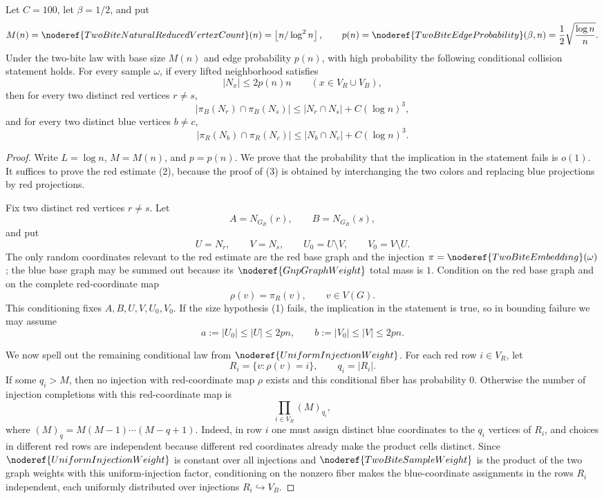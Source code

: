 \begin{lemma}
Let \(C=100\), let \(\beta=1/2\), and put
\[
M(n)=\noderef{TwoBiteNaturalReducedVertexCount}(n)
=\left\lfloor n/\log^2 n\right\rfloor,\qquad
p(n)=\noderef{TwoBiteEdgeProbability}(\beta,n)
=\frac12\sqrt{\frac{\log n}{n}} .
\]
Under the two-bite law with base size \(M(n)\) and edge probability \(p(n)\),
with high probability the following conditional collision statement holds.
For every sample \(\omega\), if every lifted neighborhood satisfies
\[
|N_x|\le 2p(n)n\qquad (x\in V_R\cup V_B),
\tag{1}
\]
then for every two distinct red vertices \(r\ne s\),
\[
|\pi_B(N_r)\cap\pi_B(N_s)|
\le |N_r\cap N_s|+C(\log n)^3,
\tag{2}
\]
and for every two distinct blue vertices \(b\ne c\),
\[
|\pi_R(N_b)\cap\pi_R(N_c)|
\le |N_b\cap N_c|+C(\log n)^3.
\tag{3}
\]
\end{lemma}
\begin{proof}
Write \(L=\log n\), \(M=M(n)\), and \(p=p(n)\).  We prove that the
probability that the implication in the statement fails is \(o(1)\).  It
suffices to prove the red estimate (2), because the proof of (3) is obtained
by interchanging the two colors and replacing blue projections by red
projections.

Fix two distinct red vertices \(r\ne s\).  Let
\[
A=N_{G_R}(r),\qquad B=N_{G_R}(s),
\]
and put
\[
U=N_r,\qquad V=N_s,\qquad U_0=U\setminus V,\qquad V_0=V\setminus U.
\]
The only random coordinates relevant to the red estimate are the red base
graph and the injection
\(\pi=\noderef{TwoBiteEmbedding}(\omega)\); the blue base graph may be summed
out because its \(\noderef{GnpGraphWeight}\) total mass is \(1\).
Condition on the red base graph and on the complete red-coordinate map
\[
\rho(v)=\pi_R(v),\qquad v\in V(G).
\]
This conditioning fixes \(A,B,U,V,U_0,V_0\).  If the size hypothesis (1) fails,
the implication in the statement is true, so in bounding failure we may assume
\[
a:=|U_0|\le |U|\le 2pn,\qquad
b:=|V_0|\le |V|\le 2pn.
\tag{4}
\]

We now spell out the remaining conditional law from
\(\noderef{UniformInjectionWeight}\).  For each red row \(i\in V_R\), let
\[
R_i=\{v:\rho(v)=i\},\qquad q_i=|R_i|.
\]
If some \(q_i>M\), then no injection with red-coordinate map \(\rho\) exists
and this conditional fiber has probability \(0\).  Otherwise the number of
injection completions with this red-coordinate map is
\[
\prod_{i\in V_R} (M)_{q_i},
\]
where \((M)_q=M(M-1)\cdots(M-q+1)\).  Indeed, in row \(i\) one must assign
distinct blue coordinates to the \(q_i\) vertices of \(R_i\), and choices in
different red rows are independent because different red coordinates already
make the product cells distinct.  Since
\(\noderef{UniformInjectionWeight}\) is constant over all injections and
\(\noderef{TwoBiteSampleWeight}\) is the product of the two graph weights with
this uniform-injection factor, conditioning on the nonzero fiber makes the
blue-coordinate assignments in the rows \(R_i\) independent, each uniformly
distributed over injections \(R_i\hookrightarrow V_B\).


\end{proof}
